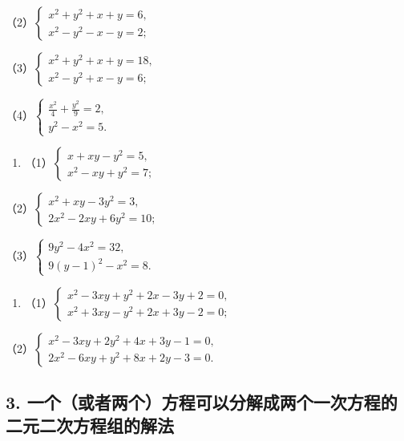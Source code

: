 （2）\(\left\{ \begin{array}{l} x^{2} + y^{2} + x + y = 6, \\ x^{2} - y^{2} - x - y = 2; \end{array} \right.\)

（3）\(\left\{ \begin{array}{l} x^{2} + y^{2} + x + y = 18, \\ x^{2} - y^{2} + x - y = 6; \end{array} \right.\)

（4）\(\left\{ \begin{array}{l} \frac{x^2}{4} + \frac{y^2}{9} = 2, \\ y^2 - x^2 = 5. \end{array} \right.\)

\begin{enumerate}[start=2]
\item
  （1）\(\left\{ \begin{array}{l} x + xy - y^2 = 5, \\ x^2 - xy + y^2 = 7; \end{array} \right.\)
\end{enumerate}

（2）\(\left\{ \begin{array}{l} x^{2} + xy - 3y^{2} = 3, \\ 2x^{2} - 2xy + 6y^{2} = 10; \end{array} \right.\)

（3）\(\left\{ \begin{array}{l} 9y^{2} - 4x^{2} = 32, \\ 9(y - 1)^{2} - x^{2} = 8. \end{array} \right.\)

\begin{enumerate}[start=3]
\item
  （1）\(\left\{ \begin{array}{l} x^{2} - 3xy + y^{2} + 2x - 3y + 2 = 0, \\ x^{2} + 3xy - y^{2} + 2x + 3y - 2 = 0; \end{array} \right.\)
\end{enumerate}

（2）\(\left\{ \begin{array}{l} x^{2} - 3xy + 2y^{2} + 4x + 3y - 1 = 0, \\ 2x^{2} - 6xy + y^{2} + 8x + 2y - 3 = 0. \end{array} \right.\)

\subsection{3. 一个（或者两个）方程可以分解成两个一次方程的二元二次方程组的解法}

